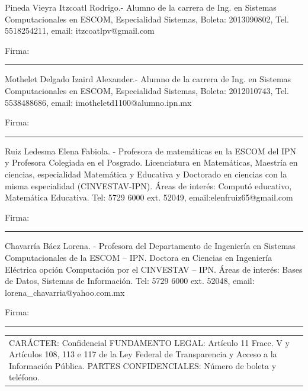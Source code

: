 \documentclass{article}
\newcommand\signature{
\noindent\begin{minipage}{10cm}
    \noindent\vspace{3pt}\par
    Firma: \rule{7cm}{1pt}
    \noindent\vspace{15pt}\par
\end{minipage}}
\begin{document}
\begin{minipage}{.45\textwidth}
Pineda Vieyra Itzcoatl Rodrigo.- Alumno de la carrera de Ing. 
en Sistemas Computacionales en ESCOM, Especialidad Sistemas, 
Boleta: 2013090802, Tel. 5518254211, email: itzcoatlpv@gmail.com
\signature


Mothelet Delgado Izaird Alexander.- Alumno de la carrera de Ing. 
en Sistemas Computacionales en ESCOM, Especialidad Sistemas, 
Boleta: 2012010743, Tel. 5538488686, email: imotheletd1100@alumno.ipn.mx
\signature

Ruiz Ledesma Elena Fabiola. - Profesora de matemáticas en la 
ESCOM del IPN y Profesora Colegiada en el Posgrado. Licenciatura 
en Matemáticas, Maestría en ciencias, especialidad Matemática y 
Educativa y Doctorado en ciencias con la misma especialidad (CINVESTAV-IPN). 
Áreas de interés: Computó educativo, Matemática Educativa. Tel: 5729 6000 ext. 
52049, email:elenfruiz65@gmail.com
\signature

Chavarría Báez Lorena. - Profesora del Departamento de Ingeniería en 
Sistemas Computacionales de la ESCOM – IPN. Doctora en Ciencias en 
Ingeniería Eléctrica opción Computación por el CINVESTAV – IPN. Áreas de 
interés: Bases de Datos, Sistemas de Información. Tel: 5729 6000 ext. 52048, 
email: lorena\_chavarria@yahoo.com.mx
\signature
	
\end{minipage}%
\hfill
\begin{minipage}{.4\textwidth}
\begin{tabular}{p{\textwidth}}
CARÁCTER: Confidencial FUNDAMENTO LEGAL: Artículo 11 Fracc. V y Artículos 108, 113 
e 117 de la Ley Federal de Transparencia y Acceso a la Información Pública. PARTES 
CONFIDENCIALES: Número de boleta y teléfono.
\end{tabular}
\end{minipage}
\newpage	

\printbibliography
\end{document}
